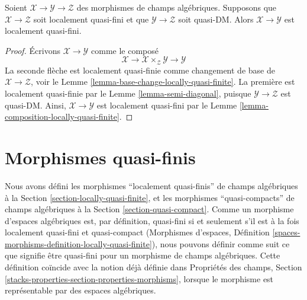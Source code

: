 \begin{lemma}
\label{lemma-locally-quasi-finite-permanence}
Soient $\mathcal{X} \to \mathcal{Y} \to \mathcal{Z}$ des morphismes de
champs algébriques. Supposons que $\mathcal{X} \to \mathcal{Z}$ soit
localement quasi-fini et que $\mathcal{Y} \to \mathcal{Z}$ soit quasi-DM.
Alors $\mathcal{X} \to \mathcal{Y}$ est localement quasi-fini.
\end{lemma}

\begin{proof}
Écrivons $\mathcal{X} \to \mathcal{Y}$ comme le composé
$$
\mathcal{X} \longrightarrow
\mathcal{X} \times_\mathcal{Z} \mathcal{Y} \longrightarrow
\mathcal{Y}
$$
La seconde flèche est localement quasi-finie comme changement de base de
$\mathcal{X} \to \mathcal{Z}$, voir le
Lemme \ref{lemma-base-change-locally-quasi-finite}.
La première est localement quasi-finie par le
Lemme \ref{lemma-semi-diagonal}, puisque
$\mathcal{Y} \to \mathcal{Z}$ est quasi-DM.
Ainsi, $\mathcal{X} \to \mathcal{Y}$ est localement quasi-fini par le
Lemme \ref{lemma-composition-locally-quasi-finite}.
\end{proof}

















\section{Morphismes quasi-finis}
\label{section-quasi-finite}

\noindent
Nous avons défini les morphismes ``localement quasi-finis'' de champs
algébriques à la Section \ref{section-locally-quasi-finite}, et les morphismes
``quasi-compacts'' de champs algébriques à la
Section \ref{section-quasi-compact}. Comme un morphisme d'espaces algébriques
est, par définition, quasi-fini si et seulement s'il est à la fois localement
quasi-fini et quasi-compact (Morphismes d'espaces, Définition
\ref{spaces-morphisms-definition-locally-quasi-finite}),
nous pouvons définir comme suit ce que signifie être quasi-fini pour un
morphisme de champs algébriques. Cette définition coïncide avec la notion déjà
définie dans Propriétés des champs,
Section \ref{stacks-properties-section-properties-morphisms}, lorsque le
morphisme est représentable par des espaces algébriques.

